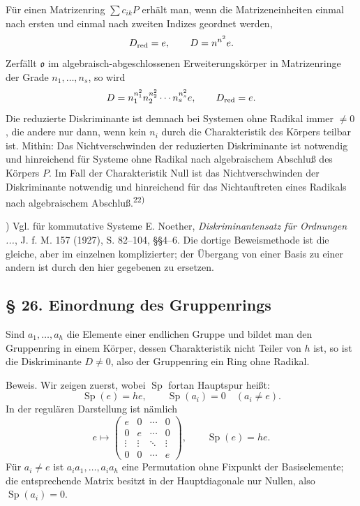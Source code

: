 \documentclass[11pt]{article}
\providecommand{\mo}{\mathfrak{o}}
\begin{document}
Für einen Matrizenring $\sum c_{ik}P$ erhält man, wenn die Matrizeneinheiten einmal nach ersten und einmal nach zweiten Indizes geordnet werden,
\[
        D_{\rm red}=e,
        \qquad
        D=n^{n^2}e.
\]
Zerfällt $\mo$ im algebraisch-abgeschlossenen Erweiterungskörper in Matrizenringe der Grade $n_1,\ldots,n_s$, so wird
\[
        D=n_1^{n_1^2}n_2^{n_2^2}\cdots n_s^{n_s^2}e,
        \qquad
        D_{\rm red}=e.
\]
Die reduzierte Diskriminante ist demnach bei Systemen ohne Radikal immer $\ne0$, die andere nur dann, wenn kein $n_i$ durch die Charakteristik des Körpers teilbar ist. Mithin: Das Nichtverschwinden der reduzierten Diskriminante ist notwendig und hinreichend für Systeme ohne Radikal nach algebraischem Abschluß des Körpers $P$. Im Fall der Charakteristik Null ist das Nichtverschwinden der Diskriminante notwendig und hinreichend für das Nichtauftreten eines Radikals nach algebraischem Abschluß.\textsuperscript{22)}

{\footnotesize{}) Vgl. für kommutative Systeme E. Noether, \emph{Diskriminantensatz für Ordnungen ...}, J. f. M. 157 (1927), S. 82--104, §§4--6. Die dortige Beweismethode ist die gleiche, aber im einzelnen komplizierter; der Übergang von einer Basis zu einer andern ist durch den hier gegebenen zu ersetzen.\par}

\subsection*{§ 26. Einordnung des Gruppenrings}
Sind $a_1,\ldots,a_h$ die Elemente einer endlichen Gruppe und bildet man den Gruppenring in einem Körper, dessen Charakteristik nicht Teiler von $h$ ist, so ist die Diskriminante $D\ne0$, also der Gruppenring ein Ring ohne Radikal.

Beweis. Wir zeigen zuerst, wobei $\operatorname{Sp}$ fortan Hauptspur heißt:
\[
        \operatorname{Sp}(e)=he,
        \qquad
        \operatorname{Sp}(a_i)=0\quad(a_i\ne e).
\]
In der regulären Darstellung ist nämlich
\[
        e\mapsto\begin{pmatrix}e&0&\cdots&0\\0&e&\cdots&0\\\vdots&\vdots&\ddots&\vdots\\0&0&\cdots&e\end{pmatrix},
        \qquad \operatorname{Sp}(e)=he.
\]
Für $a_i\ne e$ ist $a_i a_1,\ldots,a_i a_h$ eine Permutation ohne Fixpunkt der Basiselemente; die entsprechende Matrix besitzt in der Hauptdiagonale nur Nullen, also $\operatorname{Sp}(a_i)=0$.
\end{document}
